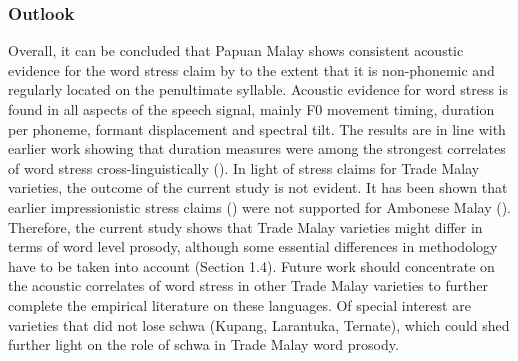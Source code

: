 \subsubsection{Outlook}
Overall, it can be concluded that Papuan Malay shows consistent acoustic evidence for the word stress claim by \citet{kluge_grammar_2017} to the extent that it is non-phonemic and regularly located on the penultimate syllable. Acoustic evidence for word stress is found in all aspects of the speech signal, mainly F0 movement timing, duration per phoneme, formant displacement and spectral tilt. The results are in line with earlier work showing that duration measures were among the strongest correlates of word stress cross-linguistically (\citealt{gordon_acoustic_2017}). In light of stress claims for Trade Malay varieties, the outcome of the current study is not evident. It has been shown that earlier impressionistic stress claims (\citealt{vanminde_malayu_1997}) were not supported for Ambonese Malay (\citealt{maskikit-essed_no_2016}). Therefore, the current study shows that Trade Malay varieties might differ in terms of word level prosody, although some essential differences in methodology have to be taken into account (Section 1.4). Future work should concentrate on the acoustic correlates of word stress in other Trade Malay varieties to further complete the empirical literature on these languages. Of special interest are varieties that did not lose schwa (Kupang, Larantuka, Ternate), which could shed further light on the role of schwa in Trade Malay word prosody.\par

